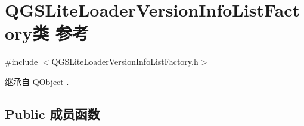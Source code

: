 \hypertarget{class_q_g_s_lite_loader_version_info_list_factory}{}\section{Q\+G\+S\+Lite\+Loader\+Version\+Info\+List\+Factory类 参考}
\label{class_q_g_s_lite_loader_version_info_list_factory}


{\ttfamily \#include $<$Q\+G\+S\+Lite\+Loader\+Version\+Info\+List\+Factory.\+h$>$}



继承自 Q\+Object .

\subsection*{Public 成员函数}
